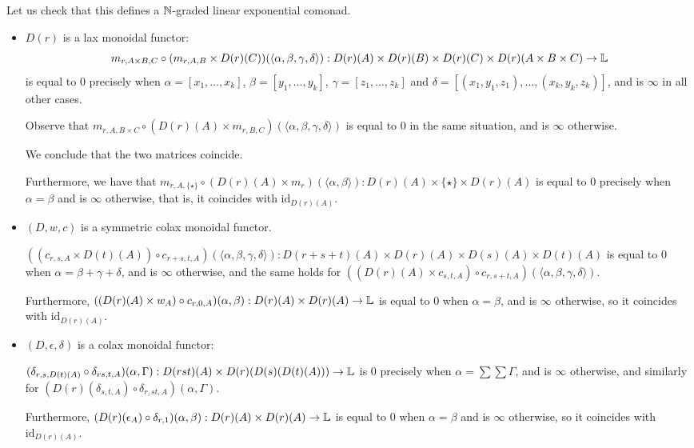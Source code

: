 Let us check that this defines a $\mathbb{N}$-graded linear exponential comonad.

\begin{itemize}

\item $D(r)$ is a lax monoidal functor:
 $$ m_{r,A\times B,C}\circ (m_{r,A,B}\times D(r)(C))(\langle \alpha,\beta,\gamma,\delta\rangle)
 :
 D(r)(A)\times D(r)(B)\times D(r)(C) \times D(r)(A\times B\times C)\to \mathbb{L}
 $$
 is equal to $0$ 
precisely when $\alpha=[x_{1},\dots, x_{k}]$, $\beta=[y_{1},\dots, y_{k}]$, $\gamma=[z_{1},\dots, z_{k}]$ and 
$\delta= [(x_{1},y_{1},z_{1}),\dots, (x_{k},y_{k},z_{k})]$, and is $\infty $ in all other cases.

Observe that
$m_{r,A,B\times C}\circ (D(r)(A)\times m_{r,B,C})(\langle\alpha,\beta,\gamma, \delta\rangle)
  $ is equal to $0$ in the same situation, and is $\infty$ otherwise.
 
 We conclude that the two matrices coincide.
 
 Furthermore, we have that 
 $m_{r,A,\{\star\}}\circ (D(r)(A)\times m_{r})(\langle \alpha,\beta\rangle): D(r)(A)\times \{\star\} \times D(r)(A)$ is equal to $0$ 
 precisely when $\alpha=\beta$ and is $\infty$ otherwise, that is, it coincides with $\mathrm{id}_{D(r)(A)}$. 
 


\item $(D,w,c)$ is a symmetric colax monoidal functor.


$((c_{r,s,A}\times D(t)(A))\circ c_{r+s,t,A}) (\langle \alpha,\beta,\gamma,\delta\rangle)
: D(r+s+t)(A)\times D(r)(A)\times D(s)(A)\times D(t)(A)$
is equal to $0$ when $\alpha=\beta+\gamma+\delta$, and is $\infty$ otherwise, and the same holds for
$((D(r)(A)\times c_{s,t,A})\circ c_{r,s+t,A}) (\langle \alpha,\beta,\gamma,\delta\rangle)
$.

Furthermore, 
$((D(r)(A)\times w_{A})\circ c_{r,0,A})(\alpha,\beta)
: D(r)(A)\times D(r)(A)\to \mathbb{L}$ is equal to $0$ when 
$\alpha=\beta$, and is $\infty$ otherwise, so it coincides with 
$\mathrm{id}_{D(r)(A)}$.

\item $(D,\epsilon,\delta)$ is a colax monoidal functor:

$(\delta_{r,s,D(t)(A)}\circ \delta_{rs,t,A})
(\alpha, \Gamma)
: D(rst)(A) \times D(r)(D(s)(D(t)(A))) \to \mathbb{L}
$
is $0$ precisely when $\alpha = \sum \sum \Gamma$, and is $\infty$ otherwise, and similarly for 
$(D(r)(\delta_{s,t,A})\circ \delta_{r,st,A})(\alpha,\Gamma)$.


Furthermore, 
$(D(r)(\epsilon_{A})\circ \delta_{r,1})( \alpha,\beta ):
D(r)(A) \times D(r)(A)\to \mathbb{L}
$ is equal to $0$ when $\alpha=\beta$ and is $\infty$ otherwise, so it coincides with $\mathrm{id}_{D(r)(A)}$.


\end{itemize}


